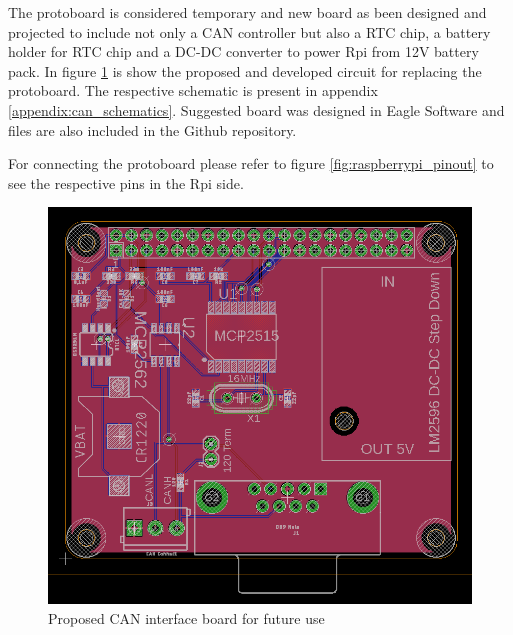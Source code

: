 The protoboard is considered temporary and new board as been designed and projected to include not only a \gls{CAN} controller but also a \gls{RTC} chip, a battery holder for \gls{RTC} chip and a DC-DC converter to power \gls{Rpi} from 12V battery pack. In figure \ref{fig:board_can} is show the proposed and developed circuit for replacing the protoboard. The respective schematic is present in appendix \ref{appendix:can_schematics}. Suggested board was designed in Eagle Software and files are also included in the Github repository.

For connecting the protoboard please refer to figure \ref{fig:raspberrypi_pinout} to see the respective pins in the \gls{Rpi} side.

\begin{figure}[!hb]
	\centering
	\includegraphics[width=0.6\linewidth]{figures/Viena_Rpi_CAN_interface_board}
	\caption{Proposed CAN interface board for future use}
	\label{fig:board_can}
\end{figure}


